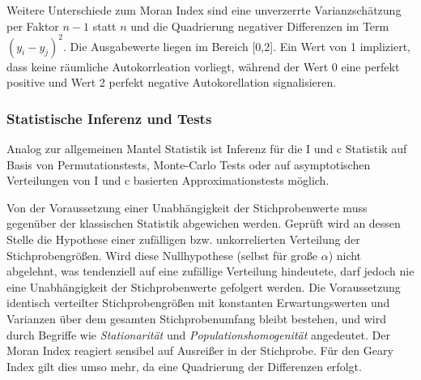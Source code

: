 Weitere Unterschiede zum Moran Index sind eine unverzerrte Varianzschätzung per Faktor $n-1$ statt $n$ und die Quadrierung negativer Differenzen im Term $\left(y_i-y_j\right)^2$.
Die Ausgabewerte liegen im Bereich [0,2]. Ein Wert von 1 impliziert, dass keine räumliche Autokorrleation vorliegt, während der Wert 0 eine perfekt positive 
und Wert 2 perfekt negative Autokorellation signalisieren. \cite[S. 265]{fischer_handbook_2010}

\subsubsection{Statistische Inferenz und Tests}

Analog zur allgemeinen Mantel Statistik ist Inferenz für die I und c Statistik auf Basis von Permutationstests, 
Monte-Carlo Tests oder auf asymptotischen Verteilungen von I und c basierten Approximationstests möglich. 

Von der Voraussetzung einer Unabhängigkeit der Stichprobenwerte muss gegenüber der klassischen Statistik abgewichen werden.
Geprüft wird an dessen Stelle die Hypothese einer zufälligen bzw. unkorrelierten Verteilung der Stichprobengrößen. 
Wird diese Nullhypothese (selbst für große $\alpha$) nicht abgelehnt, was tendenziell auf eine zufällige Verteilung hindeutete, 
darf jedoch nie eine Unabhängigkeit der Stichprobenwerte gefolgert werden.
Die Voraussetzung identisch verteilter Stichprobengrößen mit konstanten Erwartungswerten und Varianzen über dem gesamten Stichprobenumfang bleibt bestehen, 
und wird durch Begriffe wie \emph{Stationarität} und \emph{Populationshomogenität} angedeutet.
Der Moran Index reagiert sensibel auf Ausreißer in der Stichprobe. Für den Geary Index gilt dies umso mehr, da eine Quadrierung der Differenzen erfolgt.\\

